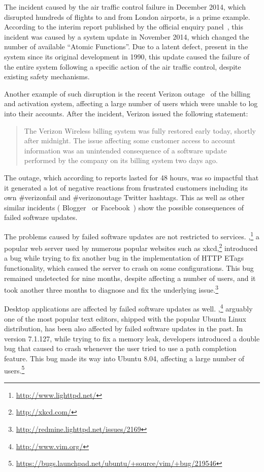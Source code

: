 The incident caused by the air traffic control failure in December 2014, which
disrupted hundreds of flights to and from London airports, is a prime example.
According to the interim report published by the official enquiry
panel~\cite{natsfailure}, this incident was caused by a system update in
November 2014, which changed the number of available ``Atomic Functions''. Due
to a latent defect, present in the system since its original development in
1990, this update caused the failure of the entire system following a specific
action of the air traffic control, despite existing safety mechanisms.

Another example of such disruption is the recent Verizon
outage~\cite{verizon-outage2014} of the billing and activation system,
affecting a large number of users which were unable to log into their accounts.
After the incident, Verizon issued the following statement:
\begin{quotation}
The Verizon Wireless billing system was fully restored early today, shortly
after midnight. The issue affecting some customer access to account information
was an unintended consequence of a software update performed by the company on
its billing system two days ago.
\end{quotation}
The outage, which according to reports lasted for 48 hours, was so impactful
that it generated a lot of negative reactions from frustrated customers
including its own \textsf{\#verizonfail} and \textsf{\#verizonoutage} Twitter
hashtags.  This as well as other similar incidents (\eg
Blogger~\cite{blogger-incident2011} or Facebook~\cite{facebook-incident2010})
show the possible consequences of failed software updates.

The problems caused by failed software updates are not restricted to services.
\lighttpd,\footnote{\url{http://www.lighttpd.net/}} a popular web server used
by numerous popular websites such as xkcd,\footnote{\url{http://xkcd.com/}}
introduced a bug while trying to fix another bug in the implementation of HTTP
ETags functionality, which caused the server to crash on some configurations.
This bug remained undetected for nine months, despite affecting a number of
users, and it took another three months to diagnose and fix the underlying
issue.\footnote{\url{http://redmine.lighttpd.net/issues/2169}}

Desktop applications are affected by failed software updates as well.
\vim,\footnote{\url{http://www.vim.org/}} arguably one of the most popular text
editors, shipped with the popular Ubuntu Linux distribution, has been also
affected by failed software updates in the past. In version 7.1.127, while
trying to fix a memory leak, \vim developers introduced a double 
bug that caused \vim to crash whenever the user tried to use a path completion
feature.  This bug made its way into Ubuntu 8.04, affecting a large number of
users.\footnote{\url{https://bugs.launchpad.net/ubuntu/+source/vim/+bug/219546}}




